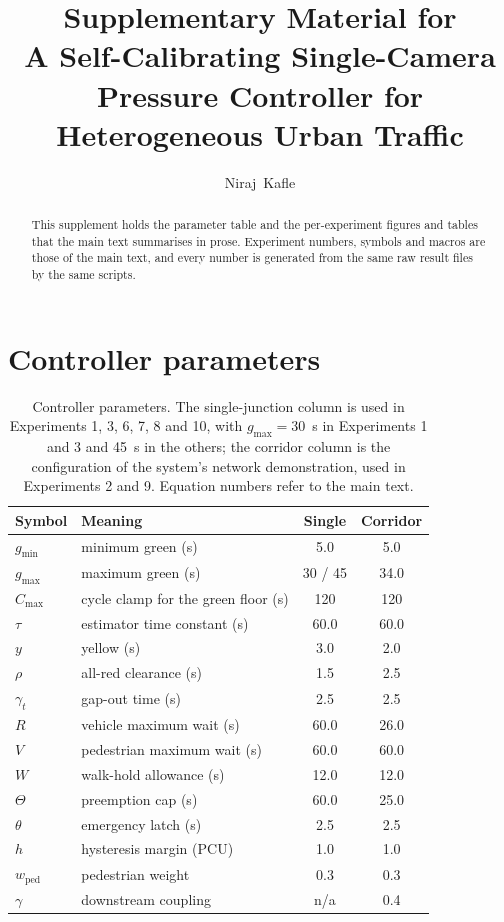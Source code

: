 \documentclass[journal,onecolumn]{IEEEtran}
\newcommand{\pcu}{PCU}
\begin{document}
\title{Supplementary Material for\\A Self-Calibrating Single-Camera Pressure Controller for Heterogeneous Urban Traffic}

\author{Niraj~Kafle}


\maketitle

\begin{abstract}
This supplement holds the parameter table and the per-experiment figures and tables that the main text
summarises in prose. Experiment numbers, symbols and macros are those of the main text, and every number
is generated from the same raw result files by the same scripts.
\end{abstract}

\section{Controller parameters}

\begin{table}[H]
\centering
\caption{Controller parameters. The single-junction column is used in Experiments 1, 3, 6, 7, 8 and 10, with
$g_{\max} = 30$~s in Experiments 1 and 3 and 45~s in the others; the corridor column is the configuration of
the system's network demonstration, used in Experiments 2 and 9. Equation numbers refer to the main text.}
\label{tab:params}
\footnotesize
\begin{tabular}{llcc}
\toprule
Symbol & Meaning & Single & Corridor \\
\midrule
$g_{\min}$ & minimum green (s) & 5.0 & 5.0 \\
$g_{\max}$ & maximum green (s) & 30 / 45 & 34.0 \\
$C_{\max}$ & cycle clamp for the green floor (s) & 120 & 120 \\
$\tau$ & estimator time constant (s) & 60.0 & 60.0 \\
$y$ & yellow (s) & 3.0 & 2.0 \\
$\rho$ & all-red clearance (s) & 1.5 & 2.5 \\
$\gamma_t$ & gap-out time (s) & 2.5 & 2.5 \\
$R$ & vehicle maximum wait (s) & 60.0 & 26.0 \\
$V$ & pedestrian maximum wait (s) & 60.0 & 60.0 \\
$W$ & walk-hold allowance (s) & 12.0 & 12.0 \\
$\Theta$ & preemption cap (s) & 60.0 & 25.0 \\
$\theta$ & emergency latch (s) & 2.5 & 2.5 \\
$h$ & hysteresis margin (\pcu) & 1.0 & 1.0 \\
$w_{\mathrm{ped}}$ & pedestrian weight & 0.3 & 0.3 \\
$\gamma$ & downstream coupling & n/a & 0.4 \\
\bottomrule
\end{tabular}
\end{table}
\end{document}
